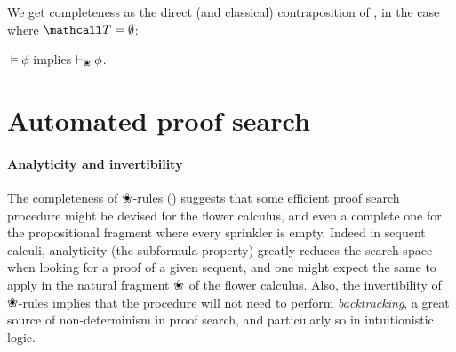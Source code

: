 We get completeness as the direct (and classical) contraposition of
, in the case where $\tT = \emptyset$:

\begin{theorem}[Completeness]
  $\vDash \phi$ implies $\vdash_\Nature \phi$.
\end{theorem}

\section{Automated proof search}

\paragraph{Analyticity and invertibility}

The completeness of $\Nature$-rules () suggests
that some efficient proof search procedure might be devised for the flower
calculus, and even a complete one for the propositional fragment where every
sprinkler is empty. Indeed in sequent calculi, analyticity (the
subformula property) greatly reduces the search space when looking for a proof
of a given sequent, and one might expect the same to apply in the natural
fragment $\Nature$ of the flower calculus. Also, the invertibility of
$\Nature$-rules implies that the procedure will not need to perform
\emph{backtracking}, a great source of non-determinism in proof
search, and particularly so in intuitionistic logic.

